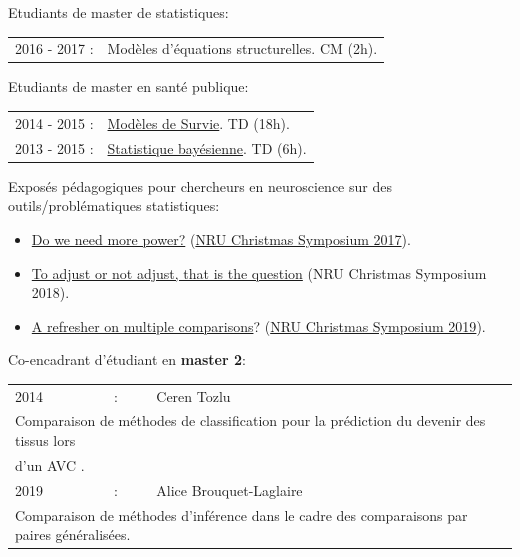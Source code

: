 \documentclass[12pt]{article}
\begin{document}
Etudiants de master de statistiques:

\begin{tabular}{l@{ }l}
2016 - 2017 : & Modèles d'équations structurelles. CM (2h). \\
\end{tabular}

\bigskip

Etudiants de master en santé publique:

\begin{tabular}{l@{ }l}
2014 - 2015 : & \href{https://clarolineconnect.univ-lyon1.fr/resource/open/file/2733301}{Modèles de Survie}. TD (18h).\\
2013 - 2015 : & \href{https://clarolineconnect.univ-lyon1.fr/resource/open/file/2733304}{Statistique bayésienne}. TD (6h).\\
\end{tabular}


\bigskip

Exposés pédagogiques pour chercheurs en neuroscience sur des
outils/problématiques statistiques:
\begin{itemize}
\item \href{https://bozenne.github.io/doc/Talks/2017-XNRU-power.pdf}{Do we need more power?} (\href{https://www.nru.dk/images/News/NeurobiologyResearchUnit-Christmas-symposium2017.pdf}{NRU Christmas Symposium 2017}).
\item \href{https://bozenne.github.io/doc/Talks/2018-XNRU-DAGs.pdf}{To adjust or not adjust, that is the question} (NRU Christmas Symposium 2018).
\item \href{https://bozenne.github.io/doc/Talks/2019-XNRU-multcomp.pdf}{A refresher on multiple comparisons}? (\href{https://nru.dk/index.php/news-menu/279-nru-christimas-symposium-2019}{NRU Christmas Symposium 2019}).
\end{itemize}

\bigskip

Co-encadrant d'étudiant en \textbf{master 2}: 

\medskip

\begin{tabular}{l@{ }l@{ }l}
2014 &:& Ceren Tozlu \\
\multicolumn{3}{l}{Comparaison de méthodes de classification pour la prédiction du devenir des tissus lors} \\ 
\multicolumn{3}{l}{d'un AVC \citep{tozlu2019comparison}.} \\ [3mm]
2019 &:& Alice Brouquet-Laglaire \\
\multicolumn{3}{l}{Comparaison de méthodes d’inférence dans le cadre des comparaisons par paires généralisées.} \\ [3mm]
\end{tabular}
\end{document}
